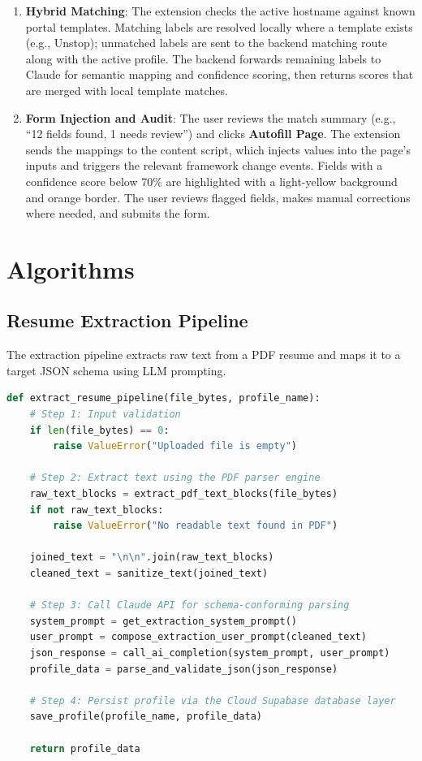 \documentclass[12pt,a4paper]{report}
\begin{document}
\begin{enumerate}
    \item \textbf{Hybrid Matching}:
    The extension checks the active hostname against known portal templates. Matching labels are resolved locally where a template exists (e.g., Unstop); unmatched labels are sent to the backend matching route along with the active profile. The backend forwards remaining labels to Claude for semantic mapping and confidence scoring, then returns scores that are merged with local template matches.
    
    \item \textbf{Form Injection and Audit}:
    The user reviews the match summary (e.g., ``12 fields found, 1 needs review'') and clicks \textbf{Autofill Page}. The extension sends the mappings to the content script, which injects values into the page's inputs and triggers the relevant framework change events. Fields with a confidence score below 70\% are highlighted with a light-yellow background and orange border. The user reviews flagged fields, makes manual corrections where needed, and submits the form.
\end{enumerate}

\chapter{Algorithms}

\section{Resume Extraction Pipeline}
The extraction pipeline extracts raw text from a PDF resume and maps it to a target JSON schema using LLM prompting.

\begin{lstlisting}[language=Python, caption=Resume Text Extraction and Structuring Pipeline]
def extract_resume_pipeline(file_bytes, profile_name):
    # Step 1: Input validation
    if len(file_bytes) == 0:
        raise ValueError("Uploaded file is empty")

    # Step 2: Extract text using the PDF parser engine
    raw_text_blocks = extract_pdf_text_blocks(file_bytes)
    if not raw_text_blocks:
        raise ValueError("No readable text found in PDF")

    joined_text = "\n\n".join(raw_text_blocks)
    cleaned_text = sanitize_text(joined_text)

    # Step 3: Call Claude API for schema-conforming parsing
    system_prompt = get_extraction_system_prompt()
    user_prompt = compose_extraction_user_prompt(cleaned_text)
    json_response = call_ai_completion(system_prompt, user_prompt)
    profile_data = parse_and_validate_json(json_response)

    # Step 4: Persist profile via the Cloud Supabase database layer
    save_profile(profile_name, profile_data)

    return profile_data
\end{lstlisting}
\end{document}

